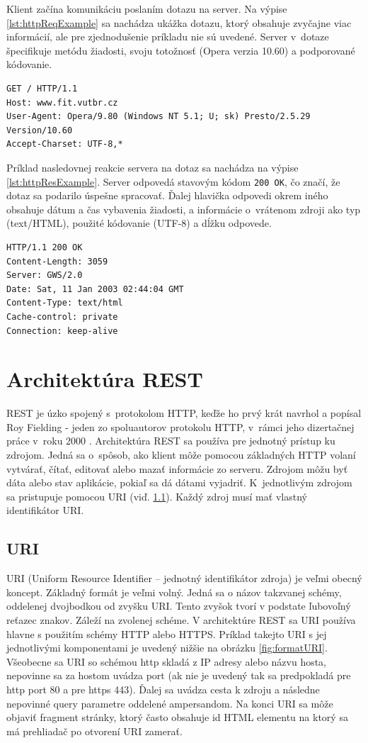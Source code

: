 \documentclass[slovak]{fitthesis}
\begin{document}
Klient začína komunikáciu poslaním dotazu na server. Na výpise \ref{lst:httpReqExample} sa nachádza ukážka dotazu, ktorý obsahuje zvyčajne viac informácií, ale pre zjednodušenie príkladu nie sú uvedené. Server v~dotaze špecifikuje metódu žiadosti, svoju totožnosť (Opera verzia 10.60) a podporované kódovanie.
\begin{lstlisting}[caption=príklad HTTP dotazu,frame=tlrb,label={lst:httpReqExample}]
GET / HTTP/1.1
Host: www.fit.vutbr.cz
User-Agent: Opera/9.80 (Windows NT 5.1; U; sk) Presto/2.5.29 Version/10.60
Accept-Charset: UTF-8,*
\end{lstlisting}
Príklad nasledovnej reakcie servera na dotaz sa nachádza na výpise \ref{lst:httpResExample}. Server odpovedá stavovým kódom \texttt{200 OK}, čo značí, že dotaz sa podarilo úspešne spracovať. Ďalej hlavička odpovedi okrem iného obsahuje dátum a čas vybavenia žiadosti, a informácie o~vrátenom zdroji ako typ (text/HTML), použité kódovanie (UTF-8) a dĺžku odpovede. 
\begin{lstlisting}[caption=príklad HTTP odpovedi,frame=tlrb,label={lst:httpResExample}]
HTTP/1.1 200 OK
Content-Length: 3059
Server: GWS/2.0
Date: Sat, 11 Jan 2003 02:44:04 GMT
Content-Type: text/html
Cache-control: private
Connection: keep-alive
\end{lstlisting}



\section{Architektúra REST}\label{rest}
REST je úzko spojený s~protokolom HTTP, keďže ho prvý krát navrhol a popísal Roy Fielding - jeden zo spoluautorov protokolu HTTP, v~rámci jeho dizertačnej práce v~roku 2000 \cite{dizertackaREST}.
Architektúra REST sa používa pre jednotný prístup ku zdrojom. Jedná sa o~spôsob, ako klient môže pomocou základných HTTP volaní vytvárať, čítať, editovať alebo mazať informácie zo serveru. Zdrojom môžu byť dáta alebo stav aplikácie, pokiaľ sa dá dátami vyjadriť. K~jednotlivým zdrojom sa pristupuje pomocou URI (viď. \ref{URI}). Každý zdroj musí mať vlastný identifikátor URI.

\subsection{URI} \label{URI}
URI (Uniform Resource Identifier – jednotný identifikátor zdroja) je veľmi obecný koncept. Základný formát je veľmi volný. Jedná sa o názov takzvanej schémy, oddelenej dvojbodkou od zvyšku URI. Tento zvyšok tvorí v podstate ľubovoľný reťazec znakov. Záleží na zvolenej schéme\cite{URIRFC}. V architektúre REST sa URI používa hlavne s použitím schémy HTTP alebo HTTPS. Príklad takejto URI s jej jednotlivými komponentami je uvedený nižšie na obrázku \ref{fig:formatURI}. Všeobecne sa URI so schémou http skladá z IP adresy alebo názvu hosta, nepovinne sa za hostom uvádza port (ak nie je uvedený tak sa predpokladá pre http port 80 a pre https 443). Ďalej sa uvádza cesta k zdroju a následne nepovinné query parametre oddelené ampersandom. Na konci URI sa môže objaviť fragment stránky, ktorý často obsahuje id HTML elementu na ktorý sa má prehliadač po otvorení URI zamerať.
\end{document}
